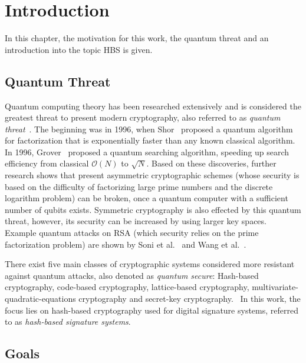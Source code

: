 \chapter{Introduction}
\label{cha:introduction}
In this chapter, the motivation for this work, the quantum threat and an introduction into the topic HBS is given.

\section{Quantum Threat}
Quantum computing theory has been researched extensively and is considered the greatest threat to present modern cryptography, also referred to as \textit{quantum threat}~\cite{impact_quantum_crypto_2018}.
The beginning was in 1996, when Shor~\cite{shors_algo_original_1999} proposed a quantum algorithm for factorization that is exponentially faster than any known classical algorithm. In 1996, Grover~\cite{grovers_algo_basispaper_1997} proposed a quantum searching algorithm, speeding up search efficiency from classical $\mathcal{O}(N)$ to $\sqrt{N}$. 
Based on these discoveries, further research shows that present asymmetric cryptographic schemes (whose security is based on the difficulty of factorizing large prime numbers and the discrete logarithm problem) can be broken, once a quantum computer with a sufficient number of qubits exists. 
Symmetric cryptography is also effected by this quantum threat, however, its security can be increased by using larger key spaces.~\cite{impact_quantum_crypto_2018} %
Example quantum attacks on RSA (which security relies on the prime factorization problem) are shown by Soni et al.~\cite{RSA_pq-attack_examples_2018} and Wang et al.~\cite{RSA_pq-attack_without_factorization_2018}.

There exist five main classes of cryptographic systems considered more resistant against quantum attacks, also denoted as \textit{quantum secure}: Hash-based cryptography, code-based cryptography, lattice-based cryptography, multivariate-quadratic-equations cryptography and secret-key cryptography.~\cite{book_pqc_bernstein_2004}
In this work, the focus lies on hash-based cryptography used for digital signature systems, referred to as \textit{hash-based signature systems}.

\section{Goals} 

